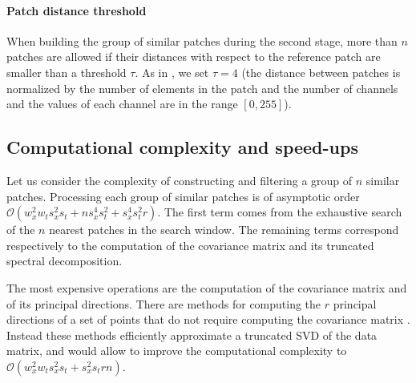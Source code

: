 \documentclass[10pt, journal, twocolumn, final, a4paper]{IEEEtran}
\begin{document}

\paragraph{Patch distance threshold} When building the group of similar
patches during the second stage, more than $n$ patches are allowed
if their distances with respect to the reference patch are smaller than a
threshold $\tau$.  As in \cite{Lebrun2013ipol}, we set $\tau = 4$ (the distance between
patches is normalized by the number of elements in the patch and the number of
channels and the values of each channel are in the range  $[0,255]$).


\subsection{Computational complexity and speed-ups}
\label{sse:complexity}

Let us consider the complexity of constructing and filtering a group of
$n$ similar patches.
Processing each group of similar patches is of asymptotic order $\mathcal
O(w_x^2 w_t s_x^2 s_t + ns_x^4s_t^2 + s_x^4s_t^2r)$.
The first term comes from the exhaustive search of the $n$ nearest patches in
the search window.  The remaining terms correspond respectively to the
computation of the covariance matrix and its truncated spectral decomposition.

The most expensive operations are the computation of the covariance matrix and
of its principal directions.
There are methods for computing the $r$ principal directions
of a set of points that do not require computing the covariance matrix
\cite{Halko2011}. Instead these methods efficiently approximate a truncated SVD
of the data matrix, and would 
allow to improve the computational complexity to $\mathcal O(w_x^2 w_t s_x^2
s_t + s_x^2s_trn)$.
\end{document}

